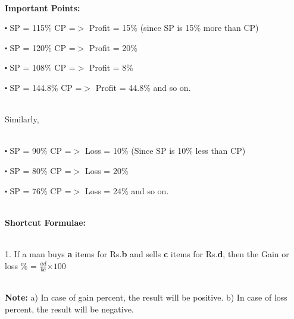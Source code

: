 \documentclass{article}
\begin{document}
\noindent \\ \textbf{Important Points: \\}

\noindent 

\noindent 

\noindent 

\noindent $\mathrm{\centerdot}$   SP = 115\% CP =$\mathrm{>}$ Profit = 15\% (since SP is 15\% more than CP)

\noindent 

\noindent $\mathrm{\centerdot}$   SP = 120\% CP =$\mathrm{>}$ Profit  = 20\%

\noindent 

\noindent $\mathrm{\centerdot}$   SP = 108\% CP =$\mathrm{>}$ Profit = 8\%

\noindent $\mathrm{\centerdot}$   SP = 144.8\% CP =$\mathrm{>}$ Profit = 44.8\% and so on. 


\noindent \\ Similarly, 

\noindent \\ $\mathrm{\centerdot}$   SP = 90\% CP =$\mathrm{>}$ Loss = 10\% (Since SP is 10\% less than CP)

\noindent 

\noindent $\mathrm{\centerdot}$   SP = 80\% CP =$\mathrm{>}$ Loss = 20\%

\noindent 

\noindent $\mathrm{\centerdot}$   SP = 76\% CP =$\mathrm{>}$ Loss = 24\% and so on.

\noindent 

\noindent 
\newpage

\noindent \\ \textbf{Shortcut Formulae:}

\noindent 

\noindent 

\noindent 

\noindent \\ 1.   If a man buys \textbf{a }items for Rs.\textbf{b }and sells \textbf{c }items for Rs.\textbf{d}, then the Gain or loss \% = $ \frac{ad}{bc} \mathrm{\times} 100$

\noindent 

\noindent \\ \textbf{Note: }
a) In case of gain percent, the result will be positive. 
b) In case of loss percent, the result will be negative.

\noindent 

\noindent 
\end{document}
